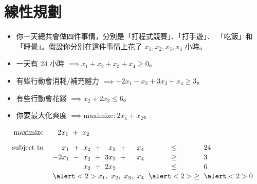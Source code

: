 \documentclass[standalone]{beamer}
\begin{document}
\section{線性規劃}

\begin{frame}{}
  \begin{itemize}[<+->]
    \itemsep=1ex
    \item 你一天總共會做四件事情，分別是「打程式競賽」、「打手遊」、
      「吃飯」和「睡覺」。假設你分別在這件事情上花了 $x_1, x_2, x_3, x_4$ 小時。
    \item 一天有 24 小時 $\implies x_1 + x_2 + x_3 + x_4 \geq 0$。
    \item 有些行動會消耗/補充體力 $\implies -2x_1 - x_2 + 3x_3 + x_4 \geq 3$。
    \item 有些行動會花錢 $\implies x_2 + 2x_3 \leq 6$。
    \item 你要最大化爽度 $\implies \text{maximize:}\ 2x_1 + x_2$。
  \end{itemize}
\end{frame}
\begin{frame}{}
\begin{overlayarea}{\textwidth}{3cm}
   {
    \begin{equation*}
      \linearprog{2x_1 \ + \ x_2}{
        {
          \arraycolsep=3pt
          \begin{array}[t]{*4{rc}l}
            x_1 & + & x_2 & + & x_3 & + & x_4 & \leq & 24 \\
            -2x_1 & - & x_2 & + & 3x_3 & + & x_4 & \geq & 3 \\
            &   & x_2 & + & 2x_3 &   & & \leq & 6 \\
            \multicolumn{7}{r}{\alert<2>{x_1,\ x_2,\ x_3,\ x_4}} & \alert<2>{\geq} & \alert<2>{0} \\
          \end{array}
        }
      }
    \end{equation*}
  }
 
\end{overlayarea}
\end{frame}
\end{document}
